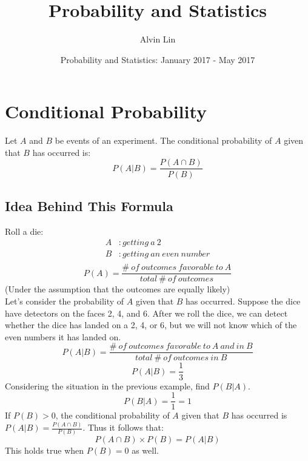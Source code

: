 \documentclass[letterpaper, 12pt]{math}
\title{Probability and Statistics}
\author{Alvin Lin}
\date{Probability and Statistics: January 2017 - May 2017}
\begin{document}
\maketitle

\section*{Conditional Probability}
Let \( A \) and \( B \) be events of an experiment. The conditional probability
of \( A \) given that \( B \) has occurred is:
\[ P(A|B) = \frac{P(A \cap B)}{P(B)} \]

\subsection*{Idea Behind This Formula}
Roll a die:
\begin{align*}
  A&: getting\ a\ 2 \\
  B&: getting\ an\ even\ number \\
\end{align*}
\[ P(A) = \frac{\#\ of\ outcomes\ favorable\ to\ A}{total\ \#\ of\ outcomes} \]
(Under the assumption that the outcomes are equally likely) \\

Let's consider the probability of \( A \) given that \( B \) has occurred.
Suppose the dice have detectors on the faces 2, 4, and 6. After we roll the
dice, we can detect whether the dice has landed on a 2, 4, or 6, but we will
not know which of the even numbers it has landed on.
\[ P(A|B) = \frac{\#\ of\ outcomes\ favorable\ to\ A\ and\ in\ B}
   {total\ \#\ of\ outcomes\ in\ B} \]
\[ P(A|B) = \frac{1}{3} \]
Considering the situation in the previous example, find \( P(B|A) \).
\[ P(B|A) = \frac{1}{1} = 1 \]
If \( P(B) > 0 \), the conditional probability of \( A \) given that \( B \)
has occurred is \( P(A|B) = \frac{P(A \cap B)}{P(B)} \). Thus it follows
that:
\[ P(A \cap B) \times P(B) = P(A|B) \]
This holds true when \( P(B) = 0 \) as well.
\end{document}
